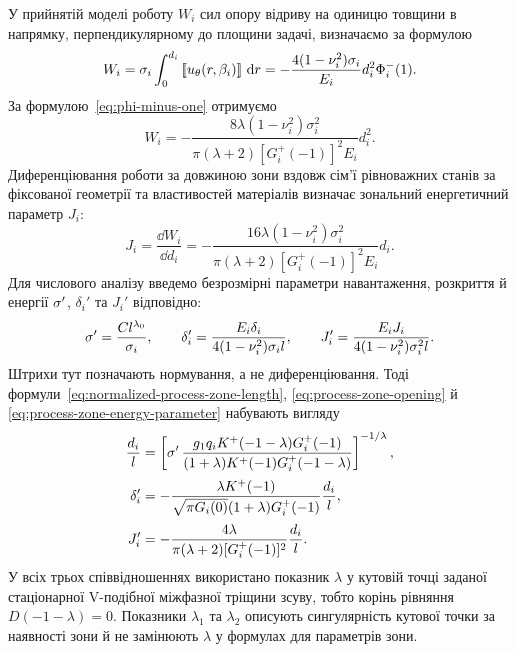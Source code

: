 У прийнятій моделі роботу $W_i$ сил опору відриву на одиницю товщини в напрямку, перпендикулярному до площини задачі, визначаємо за формулою~\citep{Cherepanov1986}
\begin{equation*}
  W_i=\sigma_i\int_0^{d_i}
      \left[\!\left[u_\theta(r,\beta_i)\right]\!\right]\,\mathop{}\!\mathrm{d} r
  =-\frac{4(1-\nu_i^2)\sigma_i}{E_i}d_i^2\Phi_i^-(1).
\end{equation*}
За формулою~\eqref{eq:phi-minus-one} отримуємо
\begin{equation*}
  W_i=-\frac{8\lambda(1-\nu_i^2)\sigma_i^2}
  {\pi(\lambda+2)[G_i^+(-1)]^2E_i}d_i^2.
\end{equation*}
Диференціювання роботи за довжиною зони вздовж сім’ї рівноважних станів за фіксованої геометрії та властивостей матеріалів визначає зональний енергетичний параметр $J_i$:
\begin{equation}
\label{eq:process-zone-energy-parameter}
  J_i=\frac{\dd W_i}{\dd d_i}
  =-\frac{16\lambda(1-\nu_i^2)\sigma_i^2}
  {\pi(\lambda+2)[G_i^+(-1)]^2E_i}d_i.
\end{equation}
Для числового аналізу введемо безрозмірні параметри навантаження, розкриття й енергії $\sigma^{\prime}$, $\delta_i'$ та $J_i'$ відповідно:
\begin{equation*}
  \sigma^{\prime}=\frac{Cl^{\lambda_0}}{\sigma_i},
  \qquad
  \delta_i'=\frac{E_i\delta_i}
  {4(1-\nu_i^2)\sigma_i l},
  \qquad
  J_i'=\frac{E_iJ_i}
  {4(1-\nu_i^2)\sigma_i^2l}.
\end{equation*}
Штрихи тут позначають нормування, а не диференціювання. Тоді формули~\eqref{eq:normalized-process-zone-length}, \eqref{eq:process-zone-opening} й \eqref{eq:process-zone-energy-parameter} набувають вигляду
\begin{equation*}
\begin{aligned}
  \frac{d_i}{l}
    &=\left[
      \sigma^{\prime}\,
      \frac{g_1q_iK^+(-1-\lambda)G_i^+(-1)}
      {(1+\lambda)K^+(-1)G_i^+(-1-\lambda)}
    \right]^{-1/\lambda},\\[2pt]
  \delta_i'
    &=-\frac{\lambda K^+(-1)}
      {\sqrt{\pi G_i(0)}(1+\lambda)G_i^+(-1)}
      \frac{d_i}{l},\\[2pt]
  J_i'
    &=-\frac{4\lambda}
      {\pi(\lambda+2)[G_i^+(-1)]^2}
      \frac{d_i}{l}.
\end{aligned}
\end{equation*}
У всіх трьох співвідношеннях використано показник $\lambda$ у кутовій точці заданої стаціонарної V-подібної міжфазної тріщини зсуву, тобто корінь рівняння $D(-1-\lambda)=0$. Показники $\lambda_1$ та $\lambda_2$ описують сингулярність кутової точки за наявності зони й не замінюють $\lambda$ у формулах для параметрів зони.

